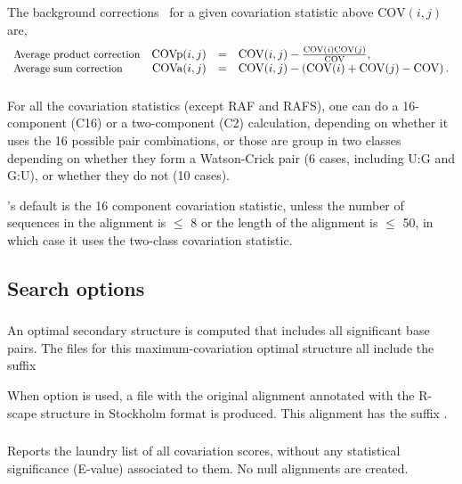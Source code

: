 The background corrections~\citep{DunnGloor07} for a given
covariation statistic above $\mathrm{COV}(i,j)$ are,
%
\[
\begin{array}{lrcl}
  \mbox{\small Average product correction} & \mathrm{COVp}(i,j) & = &  \mathrm{COV}(i,j) - \frac { \mathrm{COV}(i) \mathrm{COV}(j) } { \mathrm{COV} }, \\
  \mbox{\small Average sum correction}     & \mathrm{COVa}(i,j) & = &  \mathrm{COV}(i,j) - \left( \mathrm{COV}(i) + \mathrm{COV}(j) - \mathrm{COV} \right). \\
\end{array}
\]



\subsubsection{}
For all the covariation statistics (except RAF and RAFS), one can do a
16-component (C16) or a two-component (C2) calculation, depending on
whether it uses the 16 possible pair combinations, or those are group
in two classes depending on whether they form a Watson-Crick pair (6
cases, including U:G and G:U), or whether they do not (10 cases).

\rscape's default is the 16 component covariation statistic, unless
the number of sequences in the alignment is $\leq$ 8 or the length of
the alignment is $\leq$ 50, in which case it uses the two-class
covariation statistic.

\subsection{Search options}

\subsubsection{} An optimal secondary structure is computed that includes all significant base pairs. The files for this
maximum-covariation optimal structure all include the suffix

When option  is used, a file with the original alignment  annotated with the R-scape structure in Stockholm format is produced.
This alignment has the suffix .

\subsubsection{} Reports the laundry list of all covariation scores, without any statistical significance (E-value)
associated to them. No null alignments are created.

